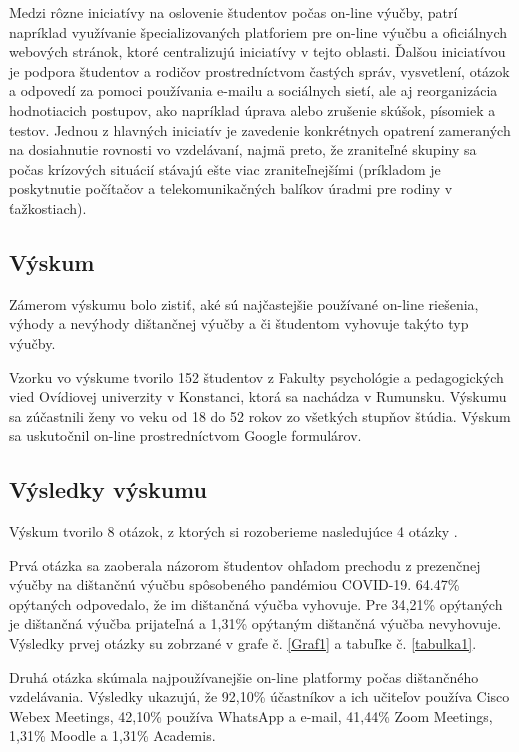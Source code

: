 \documentclass[10pt,oneside,slovak,a4paper]{article}
\begin{document}
Medzi rôzne iniciatívy na oslovenie študentov počas on-line výučby, patrí napríklad využívanie špecializovaných platforiem pre on-line výučbu a oficiálnych webových stránok,
ktoré centralizujú iniciatívy v tejto oblasti. Ďalšou iniciatívou je podpora študentov a rodičov prostredníctvom častých správ, vysvetlení, otázok a odpovedí za pomoci používania e-mailu a sociálnych sietí,
ale aj reorganizácia hodnotiacich postupov, ako napríklad úprava alebo zrušenie skúšok, písomiek a testov. Jednou z hlavných iniciatív je zavedenie konkrétnych opatrení zameraných na dosiahnutie rovnosti vo vzdelávaní,
najmä preto, že zraniteľné skupiny sa počas krízových situácií stávajú ešte viac zraniteľnejšími (príkladom je poskytnutie počítačov a telekomunikačných balíkov úradmi pre rodiny v ťažkostiach).  %

\subsection{Výskum}
Zámerom výskumu bolo zistiť, aké sú najčastejšie používané on-line riešenia, výhody a nevýhody dištančnej výučby a či študentom vyhovuje takýto typ výučby. \cite{covid19} 

Vzorku vo výskume tvorilo 152 študentov z Fakulty psychológie a pedagogických vied Ovídiovej univerzity v Konstanci, ktorá sa nachádza v Rumunsku.
Výskumu sa zúčastnili ženy vo veku od 18 do 52 rokov zo všetkých stupňov štúdia.
Výskum sa uskutočnil on-line prostredníctvom Google formulárov. 

\subsection{Výsledky výskumu}
Výskum tvorilo 8 otázok, z ktorých si rozoberieme nasledujúce 4 otázky \cite{covid19}.

Prvá otázka sa zaoberala názorom študentov ohľadom prechodu z prezenčnej výučby na dištančnú výučbu spôsobeného pandémiou COVID-19.
64.47\% opýtaných odpovedalo, že im dištančná výučba vyhovuje. Pre 34,21\% opýtaných je dištančná výučba prijateľná a 1,31\% opýtaným dištančná výučba nevyhovuje.
Výsledky prvej otázky su zobrzané v grafe č. \ref{Graf1} a tabuľke č. \ref{tabulka1}.

Druhá otázka skúmala najpoužívanejšie on-line platformy počas dištančného vzdelávania.
Výsledky ukazujú, že 92,10\% účastníkov a ich učiteľov používa Cisco Webex Meetings, 42,10\% používa WhatsApp a e-mail, 41,44\% Zoom Meetings, 1,31\% Moodle a 1,31\% Academis.
\end{document}
